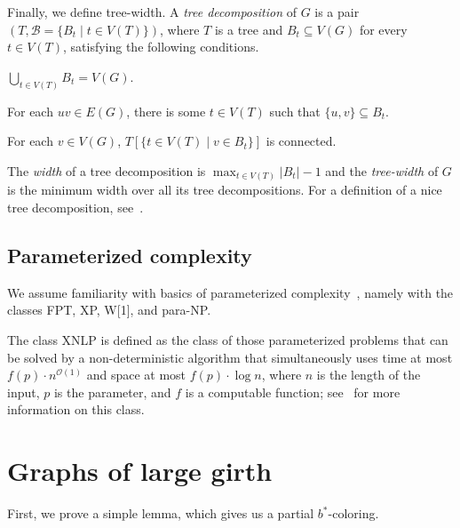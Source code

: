 \documentclass[runningheads, envcountsame]{llncs}
\newcommand{\sep}{\;|\;}
\newcommand{\seq}{\subseteq}
\newcommand{\ca}{\mathcal}
\newcommand{\FPT}{\textsf{FPT}\xspace}
\newcommand{\XP}{\textsf{XP}\xspace}
\newcommand{\XNLP}{\textsf{XNLP}\xspace}
\newcommand{\Wone}{\textsf{W[1]}\xspace}
\newcommand{\paraNP}{\textsf{para-NP}\xspace}
\begin{document}
Finally, we define tree-width.
A \emph{tree decomposition} of $G$ is a pair $(T, \ca B = \{B_t \mid t \in V(T)\})$, where $T$ is a tree and $B_t \seq V(G)$ for every $t \in V(T)$, satisfying the following conditions.
\begin{compactenum}
\item $\bigcup_{t \in V(T)} B_t = V(G)$.
\item For each $uv \in E(G)$, there is some $t \in V(T)$ such that $\{u, v\} \subseteq B_t$.
\item For each $v \in V(G)$, $T[\{t \in V(T) \sep v \in B_t\}]$ is connected.
\end{compactenum}
The \emph{width} of a tree decomposition is $\max_{t \in V(T)} |B_t| - 1$ and the \emph{tree-width} of $G$ is the minimum width over all its tree decompositions.
For a definition of a nice tree decomposition, see~\cite{CyganFKLMPPS15}.

\subsection{Parameterized complexity}

We assume familiarity with basics of parameterized complexity~\cite{flum2006parameterized}, namely with the classes \FPT, \XP, \Wone, and \paraNP.

The class \XNLP is defined as the class of those parameterized problems that can be solved by a non-deterministic algorithm that simultaneously uses time at most $f(p)\cdot n^{\ca O(1)}$ and space at most $f(p)\cdot \log n$, where $n$ is the length of the input, $p$ is the parameter, and $f$ is a computable function; see~\cite{bodlaender2024parameterized,elberfeld2015space} for more information on this class.


\section{Graphs of large girth}\label{sec:girth}

First, we prove a simple lemma, which gives us a partial $b^*$-coloring.
\end{document}
